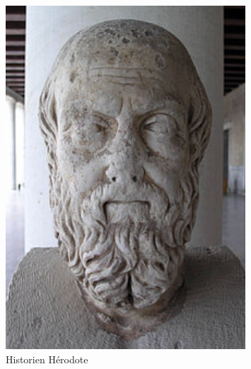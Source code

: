 \begin{minipage}[H]{0.32\linewidth}
  \begin{figure}[H]
  \centering
  \includegraphics[width=0.8\textwidth]{../resources/illustrations/herodote}
  \caption{Historien Hérodote}
  \end{figure}
\end{minipage}
